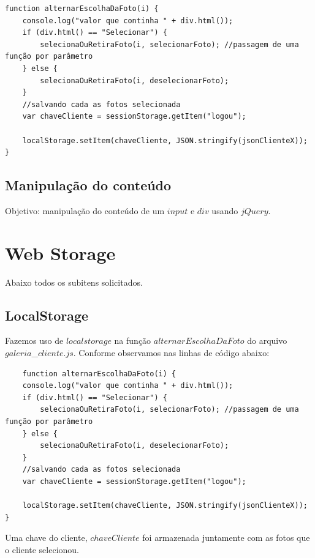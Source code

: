 \begin{lstlisting}
function alternarEscolhaDaFoto(i) {
    console.log("valor que continha " + div.html());
    if (div.html() == "Selecionar") {
        selecionaOuRetiraFoto(i, selecionarFoto); //passagem de uma função por parâmetro
    } else {
        selecionaOuRetiraFoto(i, deselecionarFoto);
    }
    //salvando cada as fotos selecionada
    var chaveCliente = sessionStorage.getItem("logou");

    localStorage.setItem(chaveCliente, JSON.stringify(jsonClienteX));
}
\end{lstlisting}

\subsection{Manipulação do conteúdo}
	Objetivo: manipulação do conteúdo de um $input$ e $div$ usando $jQuery$.

\section{Web Storage } 
	Abaixo todos os subitens solicitados.
\subsection{LocalStorage}
	Fazemos uso de $localstorage$ na função $alternarEscolhaDaFoto$ do arquivo $galeria$\_$cliente.js$. Conforme observamos nas linhas de código abaixo:
	
\begin{lstlisting}
	function alternarEscolhaDaFoto(i) {
    console.log("valor que continha " + div.html());
    if (div.html() == "Selecionar") {
        selecionaOuRetiraFoto(i, selecionarFoto); //passagem de uma função por parâmetro
    } else {
        selecionaOuRetiraFoto(i, deselecionarFoto);
    }
    //salvando cada as fotos selecionada
    var chaveCliente = sessionStorage.getItem("logou");

    localStorage.setItem(chaveCliente, JSON.stringify(jsonClienteX));
}
	\end{lstlisting}
	Uma chave do cliente, $chaveCliente$ foi armazenada juntamente com as fotos que o cliente selecionou.
	
